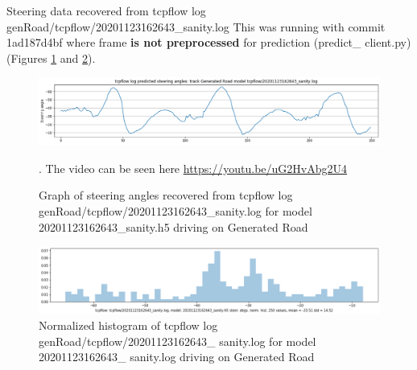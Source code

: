 Steering data recovered from tcpflow log genRoad/tcpflow/20201123162643\_sanity.log
This was running with commit 1ad187d4bf where frame \textbf{is not preprocessed} for prediction (predict\_ client.py) (Figures  \ref{fig:tcpflow_20201123162643_graph} and  \ref{fig:tcpflow_20201123162643_bins}). 

\begin{figure}[ht]
 \centering 
 \includegraphics[width=\textwidth]{Figures/tcpflow_20201123162643_sanity_graph.png}
 \caption{Graph of steering angles recovered from tcpflow log genRoad/tcpflow/20201123162643\_sanity.log for model 20201123162643\_sanity.h5 driving on Generated Road}. The video can be seen here \url{https://youtu.be/uG2HvAbg2U4}
 \label{fig:tcpflow_20201123162643_graph}
\end{figure}

\begin{figure}[ht]
 \centering 
 \includegraphics[width=\textwidth]{Figures/tcpflow_20201123162643_sanity_bins.png}
 \caption{Normalized histogram of tcpflow log genRoad/tcpflow/20201123162643\_ sanity.log for model 20201123162643\_ sanity.log driving on Generated Road}
 \label{fig:tcpflow_20201123162643_bins} 
\end{figure} 

